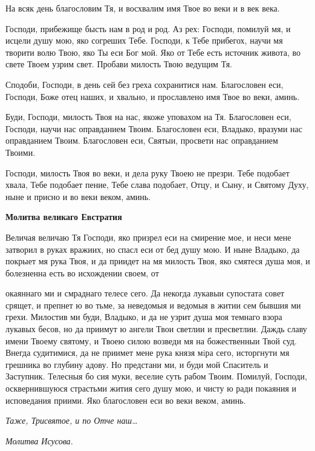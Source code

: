    На всяк день благословим Тя, и восхвалим имя Твое во веки и в век
века.


   Господи, прибежище бысть нам в род и род. Аз рех: Господи, помилуй
мя, и исцели душу мою, яко согреших Тебе. Господи, к Тебе прибегох, научи
мя творити волю Твою, яко Ты еси Бог мой. Яко от Тебе есть источник
живота, во свете Твоем узрим свет. Пробави милость Твою ведущим
Тя.


   Сподоби, Господи, в день сей без греха сохранитися нам. Благословен еси,
Господи, Боже отец наших, и хвально, и прославлено имя Твое во веки,
аминь.


   Буди, Господи, милость Твоя на нас, якоже уповахом на Тя. Благословен
еси, Господи, научи нас оправданием Твоим. Благословен еси, Владыко,
вразуми нас оправданием Твоим. Благословен еси, Святыи, просвети нас
оправданием Твоими.


   Господи, милость Твоя во веки, и дела руку Твоею не презри. Тебе
подобает хвала, Тебе подобает пение, Тебе слава подобает, Отцу, и Сыну, и
Святому Духу, ныне и присно и во веки веком, аминь.



 

\bfseries Молитва великаго Евстратия\normalfont{}


   Величая величаю Тя Господи, яко призрел еси на смирение мое, и неси
мене затворил в руках вражиих, но спасл еси от бед душу мою. И ныне
Владыко, да покрыет мя рука Твоя, и да приидет на мя милость Твоя,
яко смятеся душа моя, и болезненна есть во исхождении своем, от

окаяннаго ми и смраднаго телесе сего. Да некогда лукавыи супостата
совет срящет, и препнет ю во тьме, за неведомыя и ведомыя в житии
сем бывшия ми грехи. Милостив ми буди, Владыко, и да не узрит
душа моя темнаго взора лукавых бесов, но да приимут ю ангели Твои
светлии и пресветлии. Даждь славу имени Твоему святому, и Твоею
силою возведи мя на божественныи Твой суд. Внегда судитимися, да
не приимет мене рука князя мiра сего, исторгнути мя грешника во
глубину адову. Но предстани ми, и буди мой Спаситель и Заступник.
Телесныя бо сия муки, веселие суть рабом Твоим. Помилуй, Господи,
осквернившуюся страстьми жития сего душу мою, и чисту ю ради
покаяния и исповедания приими. Яко благословен еси во веки веком,
аминь.


 \itshape Таже,\normalfont{} \itshape Трисвятое\normalfont{}, \itshape и по\normalfont{} Отче наш…


 \itshape Молитва Исусова.\normalfont{}



